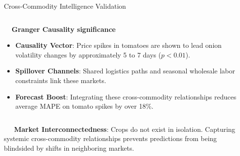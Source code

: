 \documentclass{beamer}
\begin{document}
\begin{frame}{Cross-Commodity Intelligence Validation}
\begin{columns}[T]
    \begin{column}{0.48\textwidth}
        \begin{smallcard}[0.98\textwidth, top=3pt, bottom=3pt, left=4pt, right=4pt, boxsep=0.5pt]
            \centering \textbf{\textcolor{primaryDark}{\small {}~~Granger Causality significance}}
            \vspace{0.08cm}
            \fontsize{6.8pt}{8.2pt}\selectfont
            \begin{itemize}\setlength\itemsep{4.5pt}\setlength\parskip{0pt}
                \item \textbf{Causality Vector}: Price spikes in tomatoes are shown to lead onion volatility changes by approximately 5 to 7 days ($p < 0.01$).
                \item \textbf{Spillover Channels}: Shared logistics paths and seasonal wholesale labor constraints link these markets.
                \item \textbf{Forecast Boost}: Integrating these cross-commodity relationships reduces average MAPE on tomato spikes by over 18\%.
            \end{itemize}
        \end{smallcard}
    \end{column}
\end{columns}

\vspace{0.15cm}
\begin{tcolorbox}[enhanced, colback=primaryblue!4, colframe=primaryblue!30, boxrule=0.35pt,
  arc=3.5pt, width=0.98\textwidth, left=4pt, right=4pt, top=2.5pt, bottom=2.5pt, boxsep=0pt,
  halign=center, shadow={0.5pt}{-0.5pt}{0pt}{black!8}]
    \fontsize{5.5pt}{6.5pt}\selectfont
    \textcolor{primaryDark}{~~~\textbf{Market Interconnectedness}: Crops do not exist in isolation. Capturing systemic cross-commodity relationships prevents predictions from being blindsided by shifts in neighboring markets.}
\end{tcolorbox}
\end{frame}
\end{document}
